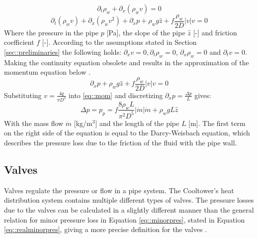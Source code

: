 \begin{equation}
\partial_t \rho_w+\partial_x\left(\rho_w v\right)=0
\end{equation}
\begin{equation}
\partial_t (\rho_w v)+\partial_x(\rho_w v^2)+ \partial_x p+\rho_w g \hat{z}  +f \frac{\rho_w}{2 D}|v| v=0
\end{equation}
Where the pressure in the pipe $p$ [Pa], the slope of the pipe $\hat{z}$ [-] and friction coefficient $f$ [-]. According to the assumptions stated in Section \ref{sec::preliminaries} the following holds: $\partial_x v = 0, \partial_t \rho_w = 0$, $\partial_x \rho_w = 0$ and $\partial_t v = 0$. Making the continuity equation obsolete and results in the approximation of the momentum equation below \cite{sibeijn2025economic}. 
\begin{equation}\label{eq::mom}
\partial_x p + \rho_w g \hat{z} +f \frac{\rho_w}{2 D}\left|v\right| v=0
\end{equation}
Substituting $v = \frac{4 q}{\pi D^2}$ into \eqref{eq::mom} and discretizing $\partial_x p = \frac{\Delta p}{L}$ gives:
\begin{equation}
    \Delta p = p_{p} =  f \frac{8\rho_w L}{\pi^2 D^5}\left|\dot{m}\right| \dot{m} + \rho_w g L \hat{z}
\end{equation}
With the mass flow $\dot{m}$ [kg/m$^3$] and the length of the pipe $L$ [m]. The first term on the right side of the equation is equal to the Darcy-Weisbach equation, which describes the pressure loss due to the friction of the fluid with the pipe wall.  




\subsection{Valves}\label{sec::valves}
Valves regulate the pressure or flow in a pipe system. The Cooltower's heat distribution system contains multiple different types of valves. The pressure losses due to the valves can be calculated in a slightly different manner than the general relation for minor pressure loss in Equation \ref{eq::minorpres}, stated in Equation \ref{eq::realminorpres}, giving a more precise definition for the valves \cite{Artikelphdchris}. 

